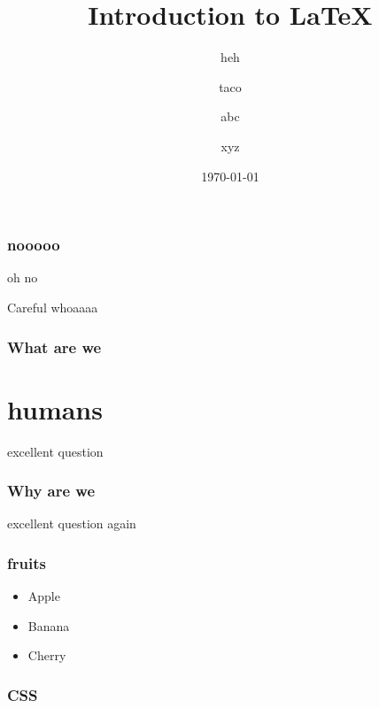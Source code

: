 \documentclass{beamer}
\begin{document}
    \begin{frame}
        \title{Introduction to \LaTeX{}}
        \author{taco \and 
        abc \and
        xyz}
        \date{\today}
        \subtitle{heh}
        \maketitle
    \end{frame}
	\begin{frame}
		\frametitle{nooooo}
		\begin{block}{}
			oh no
		\end{block}
		\begin{alertblock}{Careful}
			whoaaaa
		\end{alertblock}
	\end{frame}
    \begin{frame}
    \tableofcontents
        \frametitle{What are we}
        \section{humans}
        excellent question
    \end{frame}
    \begin{frame}
        \frametitle{Why are we}
        \tableofcontents
        excellent question again
    \end{frame}
    \begin{frame}
    	\frametitle{fruits}
    	\begin{overlayarea}{\textwidth}{\textheight}
    		\begin{itemize}
    			\item Apple
    			\pause
    			\item Banana
    			\pause
    			\item Cherry
    		\end{itemize}
    	\end{overlayarea}
    \end{frame}
    \begin{frame}
    \frametitle{CSS}
    \end{frame}
\end{document}
